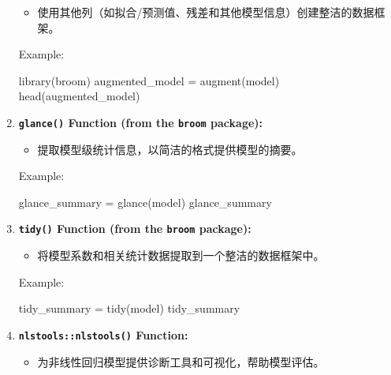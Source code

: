 \documentclass[
]{article}
\newenvironment{Shaded}{}{}
\newcommand{\FunctionTok}[1]{\textcolor[rgb]{0.02,0.16,0.49}{#1}}
\newcommand{\NormalTok}[1]{#1}
\newcommand{\OtherTok}[1]{\textcolor[rgb]{0.00,0.44,0.13}{#1}}
\begin{document}
\begin{enumerate}
  \begin{itemize}
  \item
    使用其他列（如拟合/预测值、残差和其他模型信息）创建整洁的数据框架。
  \end{itemize}

  Example:

\begin{Shaded}
\begin{Highlighting}[]
\FunctionTok{library}\NormalTok{(broom)}
\NormalTok{augmented\_model }\OtherTok{=} \FunctionTok{augment}\NormalTok{(model)}
\FunctionTok{head}\NormalTok{(augmented\_model)}
\end{Highlighting}
\end{Shaded}
\item
  \textbf{\texttt{glance()} Function (from the \texttt{broom} package):}

  \begin{itemize}
  \item
    提取模型级统计信息，以简洁的格式提供模型的摘要。
  \end{itemize}

  Example:

\begin{Shaded}
\begin{Highlighting}[]
\NormalTok{glance\_summary }\OtherTok{=} \FunctionTok{glance}\NormalTok{(model)}
\NormalTok{glance\_summary}
\end{Highlighting}
\end{Shaded}
\item
  \textbf{\texttt{tidy()} Function (from the \texttt{broom} package):}

  \begin{itemize}
  \item
    将模型系数和相关统计数据提取到一个整洁的数据框架中。
  \end{itemize}

  Example:

\begin{Shaded}
\begin{Highlighting}[]
\NormalTok{tidy\_summary }\OtherTok{=} \FunctionTok{tidy}\NormalTok{(model)}
\NormalTok{tidy\_summary}
\end{Highlighting}
\end{Shaded}
\item
  \textbf{\texttt{nlstools::nlstools()} Function:}

  \begin{itemize}
  \item
    为非线性回归模型提供诊断工具和可视化，帮助模型评估。
  \end{itemize}


\end{enumerate}
\end{document}
